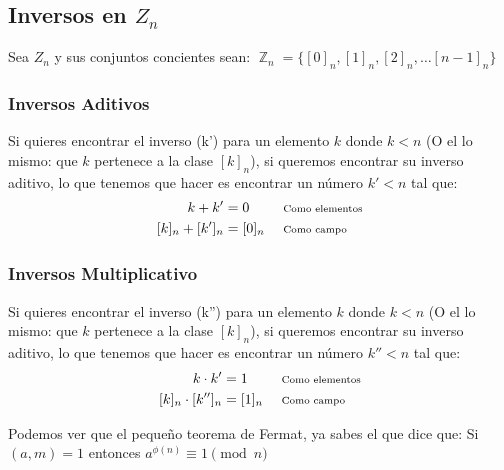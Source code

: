 \documentclass[12pt, fleqn]{report}                             %
\DeclareMathOperator \Space {\quad}                             %
\newcommand \Remember[1]{\Space\text{\scriptsize{#1}}}          %
\newenvironment{MultiLineEquation}[1]                           %
        {\begin{equation}\begin{alignedat}{#1}}                     %
        {\end{alignedat}\end{equation}}                             %
\DeclareMathOperator \Integers  {\mathbb{Z}}                     %
\begin{document}
        \subsection{Inversos en $Z_n$}

            Sea $Z_n$ y sus conjuntos concientes sean:
            $\Integers_n = \{ [0]_n , [1]_n, [2]_n, \dots  [n-1]_n\}$


            \subsubsection{Inversos Aditivos}

                Si quieres encontrar el inverso (k') para un elemento $k$ donde $k < n$
                (O el lo mismo: que $k$ pertenece a la clase $[k]_n$), si queremos encontrar
                su inverso aditivo, lo que tenemos que hacer es encontrar un número $k' < n$ tal que:
                \begin{MultiLineEquation}{3}
                    k + k'         &= 0         &&\Remember{Como elementos}    \\
                    [k]_n + [k']_n &= [0]_n     &&\Remember{Como campo}
                \end{MultiLineEquation}


            \subsubsection{Inversos Multiplicativo}

                Si quieres encontrar el inverso (k'') para un elemento $k$ donde $k < n$
                (O el lo mismo: que $k$ pertenece a la clase $[k]_n$), si queremos encontrar
                su inverso aditivo, lo que tenemos que hacer es encontrar un número $k'' < n$ tal que:
                \begin{MultiLineEquation}{3}
                    k \cdot k'          &= 1         &&\Remember{Como elementos}    \\
                    [k]_n \cdot [k'']_n &= [1]_n     &&\Remember{Como campo}
                \end{MultiLineEquation}


                Podemos ver que el pequeño teorema de Fermat, ya sabes el que dice que:
                Si $(a, m) = 1$ entonces $a^{\phi(n)} \equiv 1 \pmod{n}$
\end{document}
